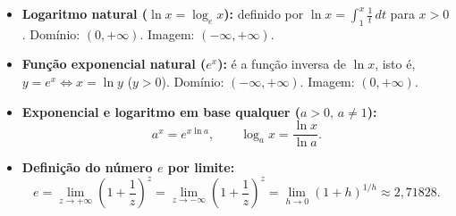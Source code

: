 \documentclass[10pt,a4paper]{article}
\begin{document}
\begin{defi}
    \begin{itemize}
        \item \textbf{Logaritmo natural ($\ln x = \log_e x$):} definido por $\displaystyle \ln x = \int_{1}^{x} \frac{1}{t}\,dt$ para $x > 0$.
              Domínio: $(0, +\infty)$. Imagem: $(-\infty, +\infty)$.
        \item \textbf{Função exponencial natural ($e^x$):} é a função inversa de $\ln x$, isto é, $y = e^x \iff x = \ln y$ ($y > 0$).
              Domínio: $(-\infty, +\infty)$. Imagem: $(0, +\infty)$.
        \item \textbf{Exponencial e logaritmo em base qualquer ($a > 0, \, a \neq 1$):}
              \[
                  a^x = e^{x \ln a}, \qquad \log_a x = \frac{\ln x}{\ln a}.
              \]
        \item \textbf{Definição do número $e$ por limite:}
              \[
                  e = \lim_{z \to +\infty} \left(1 + \frac{1}{z}\right)^z = \lim_{z \to -\infty} \left(1 + \frac{1}{z}\right)^z = \lim_{h \to 0} (1 + h)^{1/h} \approx 2{,}71828.
              \]
    \end{itemize}
\end{defi}
\end{document}
